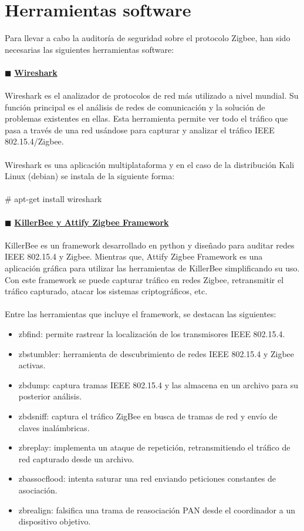 \section{Herramientas software} %
Para llevar a cabo la auditoría de seguridad sobre el protocolo Zigbee, han sido necesarias las siguientes herramientas software:
\\\\$\blacksquare$ {\underline{\textbf{Wireshark}}}
\\\\Wireshark es el analizador de protocolos de red más utilizado a nivel mundial. Su función principal es el análisis de redes de comunicación y la solución de problemas existentes en ellas. Esta herramienta permite ver todo el tráfico que pasa a través de una red usándose para capturar y analizar el tráfico IEEE 802.15.4/Zigbee.
\\\\ Wireshark es una aplicación multiplataforma y en el caso de la distribución Kali Linux (debian) se instala de la siguiente forma:
\\\\\# apt-get install wireshark
\\\\$\blacksquare$ {\underline{\textbf{KillerBee y Attify Zigbee Framework}}}
\\\\KillerBee es un framework desarrollado en python y diseñado para auditar redes IEEE 802.15.4 y Zigbee. Mientras que, Attify Zigbee Framework es una aplicación gráfica para utilizar las herramientas de KillerBee simplificando su uso. Con este framework se puede capturar tráfico en redes Zigbee, retransmitir el tráfico capturado, atacar los sistemas criptográficos, etc. 
\\\\Entre las herramientas que incluye el framework, se destacan las siguientes:
\begin{itemize}
\item zbfind: permite rastrear la localización de los transmisores IEEE 802.15.4.
\item zbstumbler: herramienta de descubrimiento de redes IEEE 802.15.4 y Zigbee activas.
\item zbdump: captura tramas IEEE 802.15.4 y las almacena en un archivo para su posterior análisis.
\item zbdsniff: captura el tráfico ZigBee en busca de tramas de red y envío de claves inalámbricas.
\item zbreplay: implementa un ataque de repetición, retransmitiendo el tráfico de red capturado desde un archivo.
\item zbassocflood: intenta saturar una red enviando peticiones constantes de asociación.
\item zbrealign: falsifica una trama de reasociación PAN desde el coordinador a un dispositivo objetivo.
\end{itemize}
